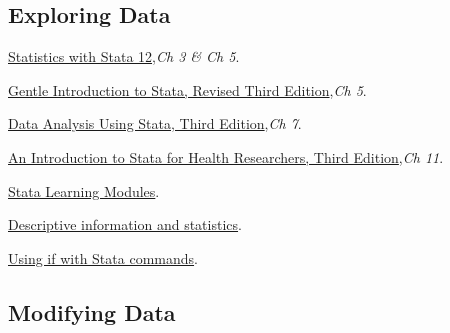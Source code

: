 \documentclass{article}
\begin{document}
\subsection{Exploring Data}

\begin{compactitem}
\item \href{http://www.stata.com/bookstore/statistics-with-stata/}{Statistics with Stata 12},\textit{Ch 3 \& Ch 5}.
\item \href{http://statapress.com/books/gentle-introduction-to-stata/}{Gentle Introduction to Stata, Revised Third Edition},\textit{Ch 5}.
\item \href{http://statapress.com/books/data-analysis-using-stata/}{Data Analysis Using Stata, Third Edition},\textit{Ch 7}.
\item \href{http://statapress.com/books/introduction-stata-health-researchers/}{An Introduction to Stata for Health Researchers, Third Edition},\textit{Ch 11}.
\item \href{http://www.ats.ucla.edu/stat/stata/modules/}{Stata Learning Modules}.
\begin{compactitem}
\item \href{http://www.ats.ucla.edu/stat/stata/modules/descript.htm}{Descriptive information and statistics}.
\item \href{http://www.ats.ucla.edu/stat/stata/modules/if.htm}{Using if with Stata commands}.
\end{compactitem}
\end{compactitem}

\subsection{Modifying Data}
\end{document}
